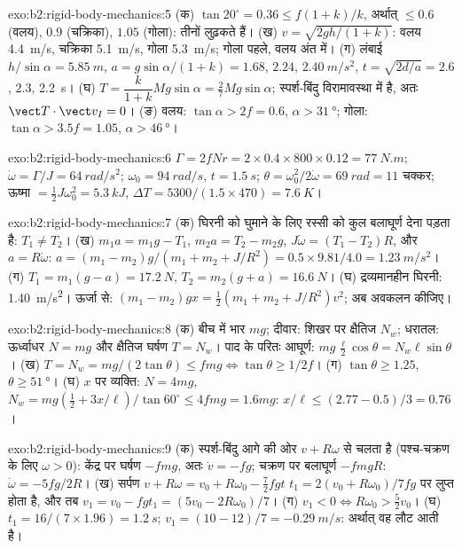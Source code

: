 \begin{solution}{exo:b2:rigid-body-mechanics:5}
(क) $\tan20^\circ = 0.36 \le f(1 + k)/k$, अर्थात् $\le 0.6$ (वलय), $0.9$
(चक्रिका), $1.05$ (गोला): तीनों लुढ़कते हैं। (ख) $v = \sqrt{2gh/(1 + k)}$: वलय
\qty{4.4}{m/s}, चक्रिका \qty{5.1}{m/s}, गोला \qty{5.3}{m/s}; गोला पहले, वलय
अंत में। (ग) लंबाई $h/\sin\alpha = \qty{5.85}{m}$,
$a = g\sin\alpha/(1 + k) =
1.68$, $2.24$, $\qty{2.40}{m/s^2}$,
$t = \sqrt{2d/a} = 2.6$, $2.3$, \qty{2.2}{s}।
(घ) $T = \dfrac{k}{1 + k}Mg\sin\alpha = \tfrac27Mg\sin\alpha$; स्पर्श-बिंदु
विरामावस्था में है, अतः $\vect T\cdot\vect v_I = 0$। (ङ) वलय:
$\tan\alpha >
2f = 0.6$, $\alpha > \qty{31}{\degree}$; गोला:
$\tan\alpha > 3.5f = 1.05$,
$\alpha > \qty{46}{\degree}$।
\end{solution}

\begin{solution}{exo:b2:rigid-body-mechanics:6}
$\Gamma = 2fNr = 2 \times 0.4 \times 800 \times 0.12 = \qty{77}{N.m}$;
$\dot\omega =
\Gamma/J = \qty{64}{rad/s^2}$; $\omega_0 = \qty{94}{rad/s}$,
$t = \qty{1.5}{s}$;
$\theta = \omega_0^2/2\dot\omega = \qty{69}{rad} = 11$ चक्कर; ऊष्मा
$= \tfrac12J
\omega_0^2 = \qty{5.3}{kJ}$,
$\Delta T = 5300/(1.5 \times 470) = \qty{7.6}{K}$।
\end{solution}

\begin{solution}{exo:b2:rigid-body-mechanics:7}
(क) घिरनी को घुमाने के लिए रस्सी को कुल बलाघूर्ण देना पड़ता है: $T_1 \ne T_2$।
(ख) $m_1a = m_1g - T_1$, $m_2a = T_2 - m_2g$, $J\dot\omega = (T_1 - T_2)R$, और
$a = R\dot\omega$:
$a = (m_1 - m_2)g/(m_1 + m_2 + J/R^2) = 0.5 \times 9.81/4.0 =
\qty{1.23}{m/s^2}$।
(ग) $T_1 = m_1(g - a) = \qty{17.2}{N}$, $T_2 = m_2(g + a) =
\qty{16.6}{N}$।
(घ) द्रव्यमानहीन घिरनी: \qty{1.40}{m/s^2}। ऊर्जा से:
$(m_1 - m_2)gx =
\tfrac12(m_1 + m_2 + J/R^2)v^2$; अब अवकलन कीजिए।
\end{solution}

\begin{solution}{exo:b2:rigid-body-mechanics:8}
(क) बीच में भार $mg$; दीवार: शिखर पर क्षैतिज $N_w$; धरातल:
ऊर्ध्वाधर $N = mg$ और क्षैतिज घर्षण $T = N_w$। पाद के परितः
आघूर्ण: $mg\,\tfrac{\ell}2\cos\theta = N_w\ell\sin\theta$। (ख)
$T = N_w =
mg/(2\tan\theta) \le fmg \iff \tan\theta \ge 1/2f$। (ग)
$\tan\theta \ge
1.25$, $\theta \ge \qty{51}{\degree}$। (घ) $x$ पर व्यक्ति:
$N = 4mg$, $N_w =
mg(\tfrac12 + 3x/\ell)/\tan60^\circ \le 4fmg = 1.6mg$:
$x/\ell \le (2.77 -
0.5)/3 = 0.76$।
\end{solution}

\begin{solution}{exo:b2:rigid-body-mechanics:9}
(क) स्पर्श-बिंदु आगे की ओर $v + R\omega$ से चलता है (पश्च-चक्रण के लिए
$\omega > 0$): केंद्र पर घर्षण $-fmg$, अतः $\dot v = -fg$; चक्रण पर बलाघूर्ण
$-fmgR$: $\dot\omega = -5fg/2R$। (ख) सर्पण
$v + R\omega = v_0 +
R\omega_0 - \tfrac72fgt$ $t_1 = 2(v_0 + R\omega_0)/7fg$
पर लुप्त होता है, और तब $v_1
= v_0 - fgt_1 = (5v_0 - 2R\omega_0)/7$। (ग)
$v_1 < 0 \iff R\omega_0 > \tfrac52v_0$।
(घ) $t_1 = 16/(7 \times 1.96) = \qty{1.2}{s}$;
$v_1 = (10 - 12)/7 = \qty{-0.29}{m/s}$:
अर्थात् वह लौट आती है।
\end{solution}

